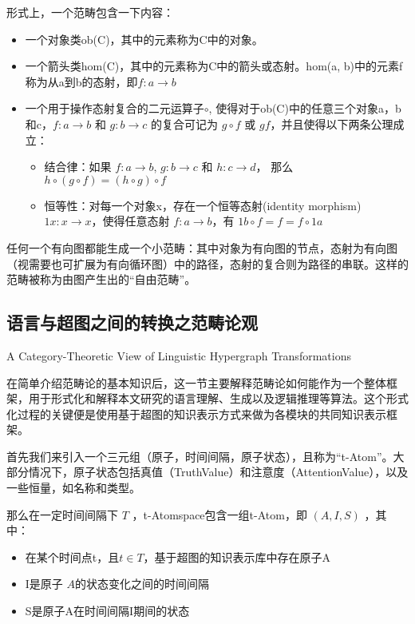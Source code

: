 形式上，一个范畴包含一下内容：

\begin{itemize}
\item 一个对象类ob(C)，其中的元素称为C中的对象。
\item 一个箭头类hom(C)，其中的元素称为C中的箭头或态射。hom(a, b)中的元素f称为从a到b的态射，即$f : a \rightarrow b$
\item 一个用于操作态射复合的二元运算子$\circ$, 使得对于ob(C)中的任意三个对象a，b和c，$f : a \rightarrow b$ 和 $g : b \rightarrow c$ 的复合可记为 $g \circ f$ 或 $gf$，并且使得以下两条公理成立：

\begin{itemize}
\item 结合律：如果 $f : a \rightarrow b$, $g : b \rightarrow c$ 和 $h : c \rightarrow d$， 那么 $h \circ (g \circ f) = (h \circ g) \circ f$
\item 恒等性：对每一个对象x，存在一个恒等态射(identity morphism) $1x : x \rightarrow x$，使得任意态射 $f : a \rightarrow b$，有 $1b \circ f = f = f \circ 1a$
\end{itemize}
\end{itemize}

任何一个有向图都能生成一个小范畴：其中对象为有向图的节点，态射为有向图（视需要也可扩展为有向循环图）中的路径，态射的复合则为路径的串联。这样的范畴被称为由图产生出的“自由范畴”。


\subsection{语言与超图之间的转换之范畴论观}{A Category-Theoretic View of Linguistic Hypergraph Transformations}

在简单介绍范畴论的基本知识后，这一节主要解释范畴论如何能作为一个整体框架，用于形式化和解释本文研究的语言理解、生成以及逻辑推理等算法。这个形式化过程的关键便是使用基于超图的知识表示方式来做为各模块的共同知识表示框架。

首先我们来引入一个三元组（原子，时间间隔，原子状态），且称为“t-Atom”。大部分情况下，原子状态包括真值（TruthValue）和注意度（AttentionValue），以及一些恒量，如名称和类型。

那么在一定时间间隔下 $T$ ，t-Atomspace包含一组t-Atom，即 $(A,I,S)$ ，其中：

\begin{itemize}
\item 在某个时间点t，且$t \in T$，基于超图的知识表示库中存在原子A
\item I是原子 $A$的状态变化之间的时间间隔
\item S是原子A在时间间隔I期间的状态
\end{itemize}

